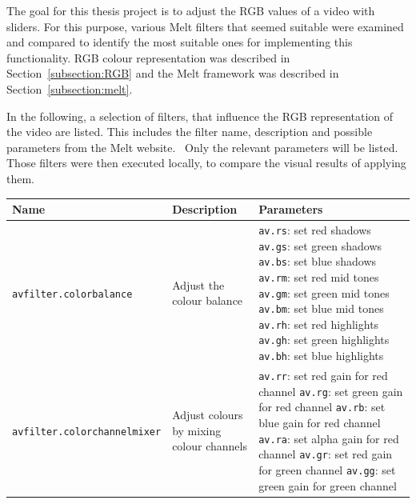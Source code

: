 \documentclass[../MasterThesis.tex]{subfiles}
\begin{document}
The goal for this thesis project is to adjust the RGB values of a video with sliders. For this purpose, various Melt filters that seemed suitable were examined and compared to identify the most suitable ones for implementing this functionality. RGB colour representation was described in Section~\ref{subsection:RGB} and the Melt framework was described in Section~\ref{subsection:melt}.

In the following, a selection of filters, that influence the RGB representation of the video are listed. This includes the filter name, description and possible parameters from the Melt website.~\cite{melt_filters} Only the relevant parameters will be listed.
Those filters were then executed locally, to compare the visual results of applying them.


\begin{table}[H]
	\footnotesize
	\begin{tabular}{lp{4.4cm}p{4.5cm}}
		\toprule
		Name & Description & Parameters \\
		\midrule
		\texttt{avfilter.colorbalance} & Adjust the colour balance & 
		\tiny{
		\texttt{av.rs}: set red shadows \newline 
		\texttt{av.gs}: set green shadows \newline 
		\texttt{av.bs}: set blue shadows \newline 
		\texttt{av.rm}: set red mid tones \newline 
		\texttt{av.gm}: set green mid tones \newline 
		\texttt{av.bm}: set blue mid tones \newline 
		\texttt{av.rh}: set red highlights \newline 
		\texttt{av.gh}: set green highlights \newline 
		\texttt{av.bh}: set blue highlights}
		\\
		\texttt{avfilter.colorchannelmixer} & Adjust colours by mixing colour channels & 
		\tiny{
		\texttt{av.rr}: set red gain for red channel \newline 
		\texttt{av.rg}: set green gain for red channel \newline 
		\texttt{av.rb}: set blue gain for red channel \newline 
		\texttt{av.ra}: set alpha gain for red channel \newline 
		\texttt{av.gr}: set red gain for green channel \newline 
		\texttt{av.gg}: set green gain for green channel \newline 
}
\end{tabular}
\end{table}
\end{document}
